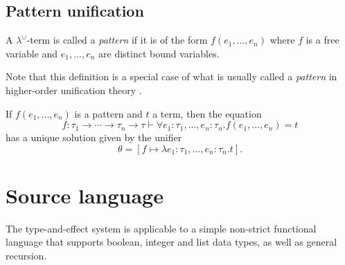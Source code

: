 \documentclass{llncs}
\newcommand{\LambdaUnion}{\lambda^\cup}
\newcommand{\LuTy}{\tau}
\begin{document}
\subsection{Pattern unification}

\begin{definition}\label{definition-pattern}
A $\LambdaUnion$-term is called a \emph{pattern} if it is of the form $f(e_1, ..., e_n)$ where $f$ is a free variable and $e_1, ..., e_n$ are distinct bound variables.
\end{definition}

Note that this definition is a special case of what is usually called a \emph{pattern} in higher-order unification theory \cite{Miller1991,Dowek:2001:HUM:778522.778525}.

If $f(e_1, ..., e_n)$ is a pattern and $t$ a term, then the equation
\[ f : \LuTy_1 \to \cdots \to \LuTy_n \to \LuTy \vdash \forall e_1 : \LuTy_1, ..., e_n : \LuTy_n. f(e_1, ..., e_n) = t \]
has a unique solution given by the unifier \[ \theta = \left[f \mapsto \lambda e_1 : \LuTy_1, ..., e_n : \LuTy_n. t \right]. \]

\section{Source language}\label{section-source-language}

The type-and-effect system is applicable to a simple non-strict functional language that supports boolean, integer and list data types, as well as general recursion.
\end{document}
